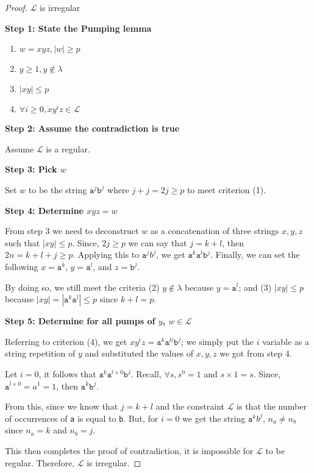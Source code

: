 \begin{proof}
    $\mathcal{L}$ is irregular

    \textbf{Step 1: State the Pumping lemma}
    \begin{enumerate}
        \item $w=xyz, |w| \geq p$
        \item $y\geq 1, y\notin\lambda$
        \item $|xy|\leq p$
        \item $\forall i\geq 0, xy^iz\in\mathcal{L}$
    \end{enumerate}
    
    \textbf{Step 2: Assume the contradiction is true}
    
    Assume $\mathcal{L}$ is a regular. 
    
    \noindent\textbf{Step 3: Pick $w$}
    
    Set $w$ to be the string $\texttt{a}^j \texttt{b}^j$ where $j+j=2j \geq p$ to meet criterion (1). 
    
    \textbf{Step 4: Determine $xyz=w$}
    
    From step 3 we need to deconstruct $w$ as a concatenation of three strings $x,y,z$ such that $|xy| \leq p$. Since, $2j\geq p$ we can say that $j=k+l$, then $2n=k+l+j \geq p$. Applying this to $\texttt{a}^jb^j$, we get $\texttt{a}^k \texttt{a}^l \texttt{b}^j$. Finally, we can set the following $x=\texttt{a}^k$, $y=\texttt{a}^l$, and $z=\texttt{b}^j$. 
    
    By doing so, we still meet the criteria (2) $y\notin \lambda$ because $y=\texttt{a}^l$; and (3) $|xy|\leq p$ because $|xy|=|\texttt{a}^k \texttt{a}^l|\leq p$ since $k+l=p$. 
    
    \textbf{Step 5: Determine for all pumps of $y$, $w\in \mathcal{L}$}
    
    Referring to criterion (4), we get $xy^iz = \texttt{a}^k \texttt{a}^{li} \texttt{b}^j$; we simply put the $i$ variable as a string repetition of $y$ and substituted the values of $x,y,z$ we got from step 4. 
    
    Let $i=0$, it follows that $\texttt{a}^k\texttt{a}^{l\times0}\texttt{b}^j$. Recall, $\forall s, s^0=1$ and $s\times1=s$. Since, $\texttt{a}^{l\times0}=a^1=1$, then $\texttt{a}^k\texttt{b}^j$. 
    
    From this, since we know that $j=k+l$ and the constraint $\mathcal{L}$ is that the number of occurrences of \texttt{a} is equal to \texttt{b}. But, for $i=0$ we get the string $\texttt{a}^k\textit{b}^j$, $n_a \neq n_b$ since $n_a = k$ and $n_b=j$. 
    
    This then completes the proof of contradiction, it is impossible for $\mathcal{L}$ to be regular. Therefore, $\mathcal{L}$ is irregular. 
\end{proof}
    
